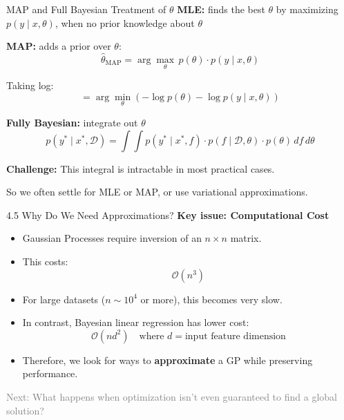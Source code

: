 \documentclass[handout,aspectratio=169]{beamer}
\begin{document}
\begin{frame}{MAP and Full Bayesian Treatment of $\theta$}
\textbf{MLE:} finds the best $\theta$ by maximizing $p(y \mid x, \theta)$, when no prior knowledge about $\theta$

\pause
\textbf{MAP:} adds a prior over $\theta$:
\[
\hat{\theta}_{\text{MAP}} = \arg\max_\theta \, p(\theta) \cdot p(y \mid x, \theta) \tag{4.31}
\]

Taking log:
\[
= \arg\min_\theta \left(
- \log p(\theta) - \log p(y \mid x, \theta)
\right) \tag{4.32}
\]

\pause
\textbf{Fully Bayesian:} integrate out $\theta$
\[
p(y^* \mid x^*, \mathcal{D}) =
\int \int p(y^* \mid x^*, f) \cdot p(f \mid \mathcal{D}, \theta) \cdot p(\theta) \, df \, d\theta \tag{4.33}
\]

\textbf{Challenge:} This integral is intractable in most practical cases.

\pause
So we often settle for MLE or MAP, or use variational approximations.
\end{frame}

\begin{frame}{4.5 Why Do We Need Approximations?}
\textbf{Key issue: Computational Cost}

\begin{itemize}
    \item Gaussian Processes require inversion of an $n \times n$ matrix.
    \item This costs:
    \[
    \mathcal{O}(n^3)
    \]
    \item For large datasets ($n \sim 10^4$ or more), this becomes very slow.
    \item In contrast, Bayesian linear regression has lower cost:
    \[
    \mathcal{O}(nd^2)
    \quad \text{where } d = \text{input feature dimension}
    \]
    \item Therefore, we look for ways to \textbf{approximate} a GP while preserving performance.
\end{itemize}

\vspace{0.3cm}
\textcolor{gray}{Next: What happens when optimization isn't even guaranteed to find a global solution?}
\end{frame}
\end{document}
